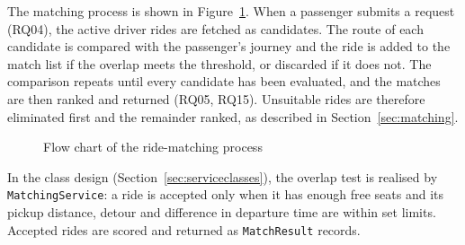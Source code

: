 The matching process is shown in Figure~\ref{fig:matching}. When a passenger submits a request (RQ04), the active driver rides are fetched as candidates. The route of each candidate is compared with the passenger's journey \citep{hong2017} and the ride is added to the match list if the overlap meets the threshold, or discarded if it does not. The comparison repeats until every candidate has been evaluated, and the matches are then ranked and returned (RQ05, RQ15). Unsuitable rides are therefore eliminated first and the remainder ranked, as described in Section~\ref{sec:matching}.

\begin{figure}[htbp]
  \centering
  \caption{Flow chart of the ride-matching process}
  \label{fig:matching}
\end{figure}

In the class design (Section~\ref{sec:serviceclasses}), the overlap test is realised by \texttt{MatchingService}: a ride is accepted only when it has enough free seats and its pickup distance, detour and difference in departure time are within set limits. Accepted rides are scored and returned as \texttt{MatchResult} records.


